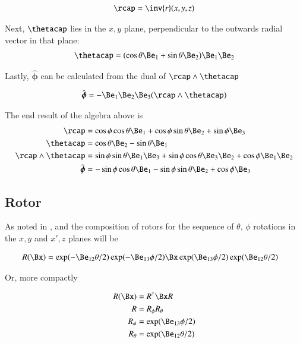 \documentclass{article}
\newcommand{\phicap}[0]{\hat{\boldsymbol{\phi}}}
\begin{document}
\begin{align*}
\rcap 
&= \inv{r} (x, y, z) \\
\end{align*}

Next, $\thetacap$ lies in the $x,y$ plane, perpendicular to the outwards radial vector in that plane:
\begin{align*}
\thetacap 
&= (\cos\theta \Be_1 + \sin\theta \Be_2) \Be_1 \Be_2 \\
\end{align*}

Lastly, $\phicap$ can be calculated from the dual of $\rcap \wedge \thetacap$

\begin{align*}
\phicap 
&= - \Be_1 \Be_2 \Be_3 (\rcap \wedge \thetacap) \\
\end{align*}

The end result of the algebra above is
\begin{align}
\rcap 
&=
\cos\phi \cos\theta \Be_1
+ \cos\phi \sin\theta \Be_2
+ \sin\phi \Be_3 \\
\thetacap 
&= \cos\theta \Be_2 - \sin\theta \Be_1 \\
\rcap \wedge \thetacap 
&=
\sin\phi \sin\theta \Be_1 \Be_3 
+ \sin\phi \cos\theta \Be_3 \Be_2 
+ \cos\phi \Be_1 \Be_2 \\
\phicap 
&=
- \sin\phi \cos\theta \Be_1 
- \sin\phi \sin\theta \Be_2 
+ \cos\phi \Be_3 %
\end{align}

\subsection{ Rotor }

As noted in \cite{doran2003gap}, and \cite{PJEulerAngle} the composition of rotors for the sequence of $\theta$, $\phi$ rotations
in the $x,y$ and $x',z$ planes will be

\begin{align*}
R(\Bx) 
&= 
\exp(-\Be_{12}\theta/2)
\exp(-\Be_{13}\phi/2)
\Bx
\exp(\Be_{13}\phi/2)
\exp(\Be_{12}\theta/2)
\end{align*}

Or, more compactly

\begin{align*}
R(\Bx) &= R^\dagger \Bx R \\
R &= R_\phi R_\theta \\
R_\phi &= \exp(\Be_{13}\phi/2) \\
R_\theta &= \exp(\Be_{12}\theta/2)
\end{align*}
\end{document}

